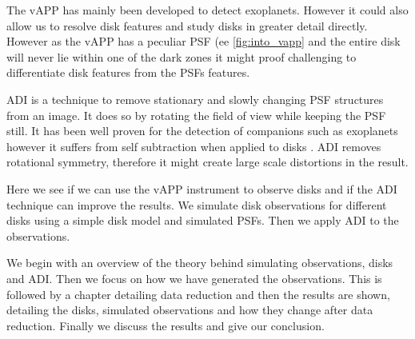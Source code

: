 The \ac{vAPP} has mainly been developed to detect exoplanets. However it could also allow us to resolve disk features and study disks in greater detail directly. However as the \ac{vAPP} has a peculiar \ac{PSF} (ee \autoref{fig:into_vapp} and the entire disk will never lie within one of the dark zones it might proof challenging to differentiate disk features from the \acp{PSF} features. 

\ac{ADI} is a technique to remove stationary and slowly changing \ac{PSF} structures from an image. It does so by rotating the field of view while keeping the \ac{PSF} still. It has been well proven for the detection of companions such as exoplanets however it suffers from self subtraction when applied to disks \cite{self_sub1} \cite{self_sub2}. \ac{ADI} removes rotational symmetry, therefore it might create large scale distortions in the result.

Here we see if we can use the \ac{vAPP} instrument to observe disks and if the \ac{ADI} technique can improve the results. We simulate disk observations for different disks using a simple disk model and simulated \acp{PSF}. Then we apply \ac{ADI} to the observations.

We begin with an overview of the theory behind simulating observations, disks and \ac{ADI}. Then we focus on how we have generated the observations. This is followed by a chapter detailing data reduction and then the results are shown, detailing the disks, simulated observations and how they change after data reduction. Finally we discuss the results and give our conclusion. 

